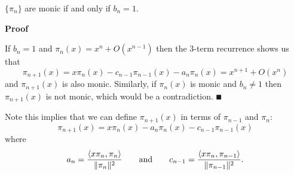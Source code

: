 \begin{corollary} $\{\ensuremath{\pi}_n\}$ are monic if and only if $b_n =  1$. \end{corollary}
\textbf{Proof}

If $b_n = 1$ and $\ensuremath{\pi}_n(x) = x^n + O(x^{n-1})$ then the 3-term recurrence shows us that
\[
\ensuremath{\pi}_{n+1}(x) = x \ensuremath{\pi}_n(x) - c_{n-1} \ensuremath{\pi}_{n-1}(x) - a_n \ensuremath{\pi}_n(x) = x^{n+1} + O(x^n)
\]
and $\ensuremath{\pi}_{n+1}(x)$ is also monic. Similarly, if $\ensuremath{\pi}_n(x)$ is monic and $b_n \ensuremath{\neq} 1$ then $\ensuremath{\pi}_{n+1}(x)$ is not monic, which would be a contradiction. \ensuremath{\QED}

Note this implies that we can define $\ensuremath{\pi}_{n+1}(x)$ in terms of $\ensuremath{\pi}_{n-1}$ and $\ensuremath{\pi}_n$:
\[
\ensuremath{\pi}_{n+1}(x) = x \ensuremath{\pi}_n(x) - a_n \ensuremath{\pi}_n(x) - c_{n-1} \ensuremath{\pi}_{n-1}(x)
\]
where
\[
a_n = {\ensuremath{\langle}x \ensuremath{\pi}_n, \ensuremath{\pi}_n\ensuremath{\rangle} \over \| \ensuremath{\pi}_n\|^2} \qquad \hbox{and} \qquad c_{n-1} = {\ensuremath{\langle}x \ensuremath{\pi}_n, \ensuremath{\pi}_{n-1}\ensuremath{\rangle} \over \| \ensuremath{\pi}_{n-1}\|^2}.
\]
